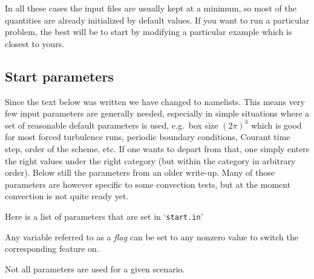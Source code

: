 \documentclass[12pt,twoside,notitlepage,a4paper]{article}
\newcommand{\file}[1]{`\texttt{#1}'}
\newcommand{\dfn}[1]{\textsl{#1}\index{#1}\/}
\begin{document}


In all these cases the input files are usually kept at a minimum, so most
of the quantities are already initialized by default values.
If you want to run a particular problem, the best will be to start by
modifying a particular example which is closest to yours.


\subsection{Start parameters}

Since the text below was written we have changed to namelists.
This means very few input parameters are generally needed,
especially in simple situations where a set of reasonable
default parameters is used, e.g.\ box size $(2\pi)^3$ which is
good for most forced turbulence runs, periodic boundary
conditions, Courant time step, order of the scheme, etc.
If one wants to depart from that, one simply enters the right
values under the right category (but within the category in
arbitrary order). Below still the parameters from an older
write-up. Many of those parameters are however specific to
some convection tests, but at the moment convection is not
quite ready yet.

\label{start-params}

Here is a list of parameters that are set in \file{start.in}

Any variable referred to as a \dfn{flag} can be set to any nonzero value
to switch the corresponding feature on.

Not all parameters are used for a given scenario.
\end{document}
